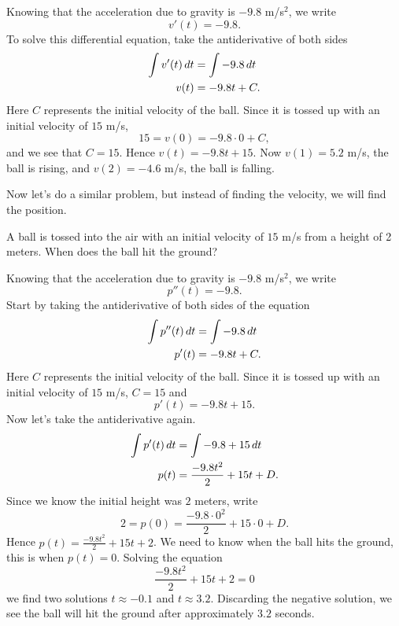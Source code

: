 \begin{solution}
Knowing that the acceleration due to gravity is $-9.8$ m/s$^2$, we write
\[
v'(t) = -9.8.
\]
To solve this differential equation, take the antiderivative of both sides
\begin{align*}
\int v'(t) \, d t &= \int -9.8 \, d t\\
v(t) &= -9.8t + C.
\end{align*}
Here $C$ represents the initial velocity of the ball. Since it is
tossed up with an initial velocity of $15$ m/s, 
\[
15 = v(0) = -9.8\cdot 0 + C,
\]
and we see that $C=15$. Hence $v(t) = -9.8t + 15$. Now $v(1) = 5.2$
m/s, the ball is rising, and $v(2) = -4.6$ m/s, the ball is falling.
\end{solution}

Now let's do a similar problem, but instead of finding the velocity,
we will find the position.

\begin{example}
A ball is tossed into the air with an initial velocity of $15$ m/s
from a height of 2 meters. When does the ball hit the ground?
\end{example}

\begin{solution}
Knowing that the acceleration due to gravity is $-9.8$ m/s$^2$, we write
\[
p''(t) = -9.8.
\]
Start by taking the antiderivative of both sides of the equation
\begin{align*}
\int p''(t) \, d t &= \int -9.8 \, d t\\
p'(t) &= -9.8t + C.
\end{align*}
Here $C$ represents the initial velocity of the ball. Since it is
tossed up with an initial velocity of $15$ m/s, $C = 15$ and 
\[
p'(t) = -9.8t + 15.
\]
Now let's take the antiderivative again. 
\begin{align*}
\int p'(t) \, d t &= \int -9.8 +15\, d t\\
p(t) &= \frac{-9.8t^2}{2} + 15t + D.
\end{align*}
Since we know the initial height was $2$ meters, write
\[
2 = p(0) =  \frac{-9.8\cdot 0^2}{2} + 15\cdot 0 + D.
\]
Hence $p(t) = \frac{-9.8t^2}{2} + 15t + 2$. We need to know when the
ball hits the ground, this is when $p(t)=0$. Solving the equation
\[
\frac{-9.8t^2}{2} + 15t + 2 = 0
\]
we find two solutions $t\approx -0.1$ and $t\approx 3.2$. Discarding
the negative solution, we see the ball will hit the ground after
approximately $3.2$ seconds.
\end{solution}


